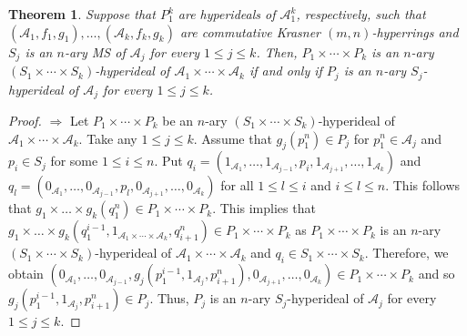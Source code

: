 \documentclass[preprint,review,10pt]{amsart}
\newtheorem{theorem}{Theorem}[section]
\theoremstyle{definition}
\theoremstyle{remark}
\numberwithin{equation}{section}
\begin{document}
\begin{theorem} \label{cart2}
Suppose that $P_1^k$ are hyperideals of $\mathscr{A}_1^k$, respectively, such that $(\mathscr{A}_1, f_1, g_1), \ldots, (\mathscr{A}_k, f_k, g_k)$ are commutative Krasner $(m,n)$-hyperrings and $S_j$ is an  $n$-ary MS of $\mathscr{A}_j$ for every $1 \leq j \leq k$. Then, $P_1 \times \cdots \times P_k$ is an $n$-ary $(S_1 \times \cdots \times S_k)$-hyperideal of $\mathscr{A}_1 \times \cdots \times \mathscr{A}_k$ if and only if $P_j$ is an $n$-ary $S_j$-hyperideal of $\mathscr{A}_j$ for every $1 \leq j \leq k$.
\end{theorem}
\begin{proof}
$\Longrightarrow$ Let $P_1 \times \cdots \times P_k$ be an $n$-ary $(S_1 \times \cdots \times S_k)$-hyperideal of $\mathscr{A}_1 \times \cdots \times \mathscr{A}_k$. Take any $1 \leq j \leq k$. Assume that $g_j(p_1^n) \in P_j$ for $p_1^n \in \mathscr{A}_j$ and $p_i \in S_j$ for some $1 \leq i \leq n$. Put  $q_i=(1_{\mathscr{A}_1},\ldots,1_{\mathscr{A}_{j-1}},p_i,1_{\mathscr{A}_{j+1}},\ldots,1_{\mathscr{A}_k})$ and $q_l=(0_{\mathscr{A}_1},\ldots,0_{\mathscr{A}_{j-1}},p_l,0_{\mathscr{A}_{j+1}},\ldots,0_{\mathscr{A}_k})$ for all $1 \leq l \leq i$ and $i \leq l \leq n$. This follows that $g_1 \times \ldots \times  g_k (q_1^n) \in P_1 \times \cdots \times P_k$. This implies that $g_1 \times \ldots \times  g_k (q_1^{i-1},1_{\mathscr{A}_1 \times \cdots \times \mathscr{A}_k},q_{i+1}^n) \in P_1 \times \cdots \times P_k$ as $P_1 \times \cdots \times P_k$ is an $n$-ary $(S_1 \times \cdots \times S_k)$-hyperideal of $\mathscr{A}_1 \times \cdots \times \mathscr{A}_k$ and $q_i \in S_1 \times \cdots \times S_k$. Therefore,  we obtain $(0_{\mathscr{A}_1},\ldots,0_{\mathscr{A}_{j-1}},g_j(p_1^{i-1},1_{\mathscr{A}_j},p_{i+1}^n),0_{\mathscr{A}_{j+1}},\ldots,0_{\mathscr{A}_k}) \in P_1 \times \cdots \times P_k$ and so $g_j(p_1^{i-1},1_{\mathscr{A}_j},p_{i+1}^n) \in P_j$. Thus, $P_j$ is an $n$-ary $S_j$-hyperideal of $\mathscr{A}_j$ for every $1 \leq j \leq k$.



\end{proof}
\end{document}
